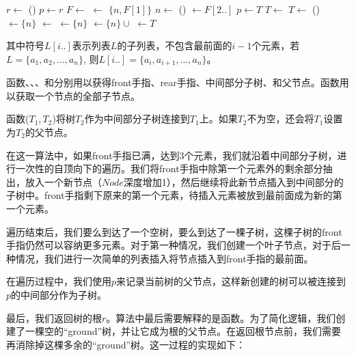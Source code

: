 \documentclass[b5paper]{ctexart}
\begin{document}
\begin{algorithmic}
  \State $r \gets $ ()
  \State $p \gets r$
  \State {}
    \State $F \gets $   
    \State {} $\gets$ $\{n, F[1]\}$  
    \State $n \gets$ ()
    \State {} $\gets F[2..]$  
    \State $p \gets T$
    \State $T \gets$ 
  \EndWhile
    \State $T \gets$ ()
    \State {}$\gets \{ n \}$
    \State {} $\gets$ 
    \State {} $\gets \{ n \}$
  \Else
    \State {} $\gets \{ n \} \cup $ 
  \EndIf
  \State {} $\gets T$
  \State \Return {}
\EndFunction
\end{algorithmic}

其中符号$L[i..]$表示列表$L$的子列表，不包含最前面的$i-1$个元素，若$L = \{a_1, a_2, ..., a_n\}$, 则$L[i..] = \{a_i, a_{i+1}, ..., a_n\}$。

函数、、、和分别用以获得front手指、rear手指、中间部分子树、和父节点。函数用以获取一个节点的全部子节点。

函数($T_1, T_2$)将树$T_2$作为中间部分子树连接到$T_1$上。如果$T_2$不为空，还会将$T_1$设置为$T_2$的父节点。

在这一算法中，如果front手指已满，达到3个元素，我们就沿着中间部分子树，进行一次性的自顶向下的遍历。我们将front手指中除第一个元素外的剩余部分抽出，放入一个新节点（$Node$深度增加1），然后继续将此新节点插入到中间部分的子树中。front手指剩下原来的第一个元素，待插入元素被放到最前面成为新的第一个元素。

遍历结束后，我们要么到达了一个空树，要么到达了一棵子树，这棵子树的front手指仍然可以容纳更多元素。对于第一种情况，我们创建一个叶子节点，对于后一种情况，我们进行一次简单的列表插入将节点插入到front手指的最前面。

在遍历过程中，我们使用$p$来记录当前树的父节点，这样新创建的树可以被连接到$p$的中间部分作为子树。

最后，我们返回树的根$r$。算法中最后需要解释的是函数。为了简化逻辑，我们创建了一棵空的“ground”树，并让它成为根的父节点。在返回根节点前，我们需要再消除掉这棵多余的“ground”树。这一过程的实现如下：
\end{document}

